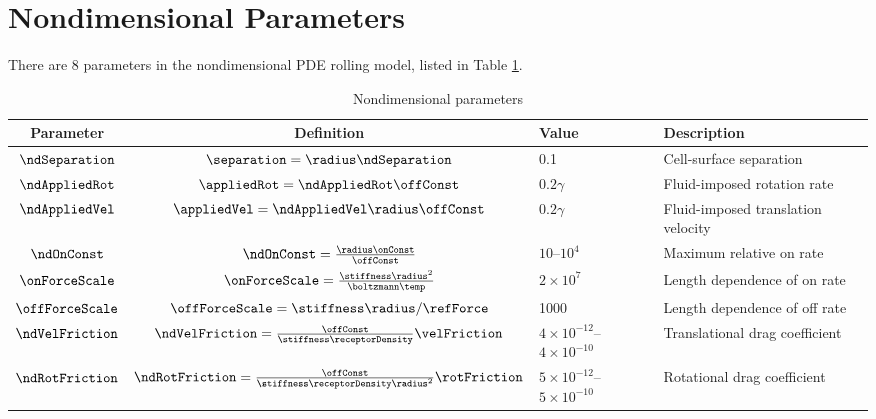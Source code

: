 \section{Nondimensional Parameters}
\label{sec:nd-params}

There are 8 parameters in the nondimensional PDE rolling model, listed
in Table \ref{tab:nd-params}.

\begin{table}
  \renewcommand{\arraystretch}{1.5}
  \centering
  \begin{tabular}{ccll}
    \toprule
    Parameter & Definition & Value & Description \\
    \midrule
    $\ndSeparation$ & $\separation = \radius\ndSeparation$ & 0.1
                                   & Cell-surface separation \\
    $\ndAppliedRot$ & $\appliedRot = \ndAppliedRot\offConst$
                           & $0.2\gamma$ & Fluid-imposed rotation rate
    \\
    $\ndAppliedVel$ & $\appliedVel = \ndAppliedVel\radius\offConst$
                           & $0.2\gamma$ & Fluid-imposed translation
                                           velocity \\
    $\ndOnConst$ & $\ndOnConst = \frac{\radius\onConst}{\offConst}$
                           & $10$--$10^4$ & Maximum relative on rate \\
    $\onForceScale$ & $\onForceScale =
                    \frac{\stiffness\radius^2}{\boltzmann\temp}$
                           & $2 \times 10^7$ & Length dependence of on
                                               rate \\
    $\offForceScale$ & $\offForceScale = \stiffness\radius/\refForce$
                           & 1000 & Length dependence of off rate \\
    $\ndVelFriction$ & $\ndVelFriction =
                     \frac{\offConst}{\stiffness\receptorDensity}
                     \velFriction$ & $4 \times 10^{-12}$--$4 \times
                                     10^{-10}$
                                   & Translational drag coefficient \\
    $\ndRotFriction$ & $\ndRotFriction =
                     \frac{\offConst}{\stiffness\receptorDensity
                                      \radius^2}\rotFriction$
                           & $5 \times 10^{-12}$--$5 \times 10^{-10}$
                                   & Rotational drag coefficient \\
    \bottomrule                                 
  \end{tabular}
  \caption{Nondimensional parameters}
  \label{tab:nd-params}
\end{table}
